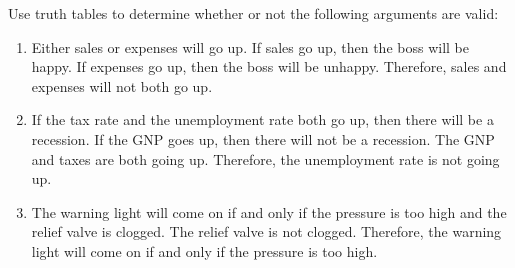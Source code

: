 Use truth tables to determine whether or not the following arguments are valid:
\begin{enumerate}[label=(\alph*)]
    \item Either sales or expenses will go up. If sales go up, then the boss will be happy. If expenses go up, then the boss will be unhappy. Therefore, sales and expenses will not both go up.
    \item If the tax rate and the unemployment rate both go up, then there will be a recession. If the GNP goes up, then there will not be a recession. The GNP and taxes are both going up. Therefore, the unemployment rate is not going up.
    \item The warning light will come on if and only if the pressure is too high and the relief valve is clogged. The relief valve is not clogged. Therefore, the warning light will come on if and only if the pressure is too high.
\end{enumerate}

